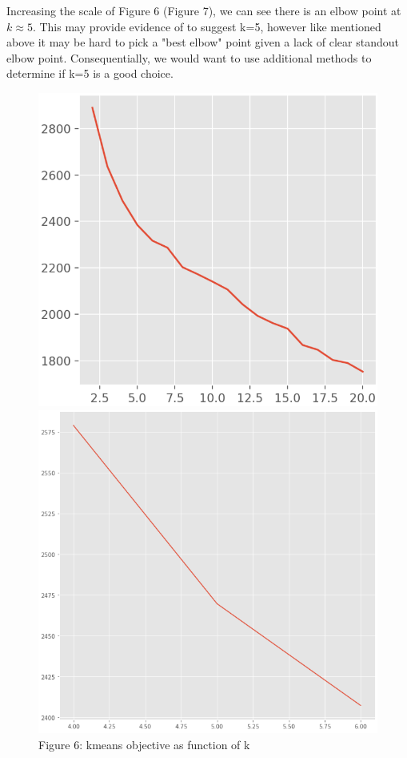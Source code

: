 \documentclass[12pt,article]{article}
\begin{document}
Increasing the scale of Figure 6 (Figure 7), we can see there is an elbow point at $k\approx5$. This may provide evidence of to suggest k=5, however like mentioned above it may be hard to pick a "best elbow" point given a lack of clear standout elbow point. Consequentially, we would want to use additional methods to determine if k=5 is a good choice. 
\begin{figure}[H]
\centering
\begin{minipage}{.45\textwidth}
  \centering
  \includegraphics[width=1\linewidth]{images/clustering_inertia_graph.png}
  \captionsetup{labelformat=empty}
  \caption{\scriptsize{Figure 6: kmeans objective as function of k}}
\end{minipage}%
\hspace{25pt}
\begin{minipage}{.42\textwidth}
  \centering
  \includegraphics[width=1\linewidth]{images/Zoomed_inertia_graph.png}

\end{minipage}
\end{figure}
\end{document}

